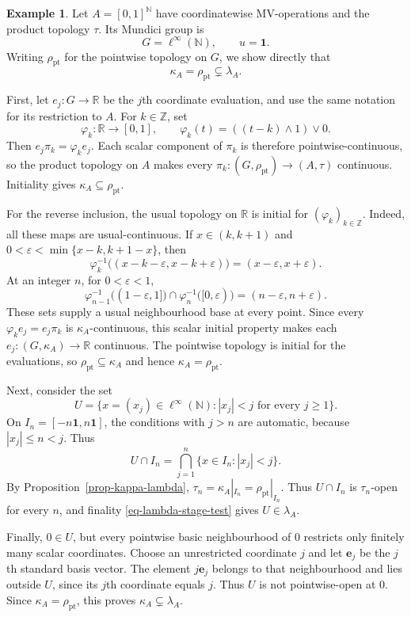 \documentclass[preprint,3p]{elsarticle}
\theoremstyle{plain}
\theoremstyle{definition}
\newtheorem{exmp}[thm]{Example}
\numberwithin{equation}{section}
\begin{document}
\begin{exmp}
\label{exmp-kappa-lambda-strict}
Let $A=[0,1]^{\mathbb N}$ have coordinatewise MV-operations and the
product topology $\tau$.  Its Mundici group is
\[
 G=\ell^\infty(\mathbb N),\qquad u=\mathbf1.
\]
Writing $\rho_{\mathrm{pt}}$ for the pointwise topology on $G$, we
show directly that
\[
 \kappa_A=\rho_{\mathrm{pt}}\subsetneq\lambda_A.
\]

First, let $e_j\colon G\longrightarrow\mathbb R$ be the $j$th
coordinate evaluation, and use the same notation for its restriction
to $A$.  For $k\in\mathbb Z$, set
\[
 \varphi_k\colon\mathbb R\longrightarrow[0,1],\qquad
 \varphi_k(t)=((t-k)\wedge1)\vee0.
\]
Then $e_j\pi_k=\varphi_ke_j$.  Each scalar component of $\pi_k$ is
therefore pointwise-continuous, so the product topology on $A$ makes
every $\pi_k\colon(G,\rho_{\mathrm{pt}})\longrightarrow(A,\tau)$
continuous.  Initiality gives $\kappa_A\subseteq\rho_{\mathrm{pt}}$.

For the reverse inclusion, the usual topology on $\mathbb R$ is
initial for $(\varphi_k)_{k\in\mathbb Z}$.  Indeed, all these maps
are usual-continuous.  If $x\in(k,k+1)$ and
$0<\varepsilon<\min\{x-k,k+1-x\}$, then
\[
 \varphi_k^{-1}\bigl((x-k-\varepsilon,x-k+\varepsilon)\bigr)
 =(x-\varepsilon,x+\varepsilon).
\]
At an integer $n$, for $0<\varepsilon<1$,
\[
 \varphi_{n-1}^{-1}\bigl((1-\varepsilon,1]\bigr)
 \cap\varphi_n^{-1}\bigl([0,\varepsilon)\bigr)
 =(n-\varepsilon,n+\varepsilon).
\]
These sets supply a usual neighbourhood base at every point.
Since every $\varphi_ke_j=e_j\pi_k$ is $\kappa_A$-continuous,
this scalar initial property makes each
$e_j\colon(G,\kappa_A)\longrightarrow\mathbb R$ continuous.
The pointwise topology is initial for the evaluations, so
$\rho_{\mathrm{pt}}\subseteq\kappa_A$ and hence
$\kappa_A=\rho_{\mathrm{pt}}$.

Next, consider the set
\[
 U=\{x=(x_j)\in\ell^\infty(\mathbb N):
                   |x_j|<j\text{ for every }j\geq1\}.
\]
On $I_n=[-n\mathbf1,n\mathbf1]$, the conditions with $j>n$ are
automatic, because $|x_j|\leq n<j$.  Thus
\[
 U\cap I_n=\bigcap_{j=1}^n\{x\in I_n:|x_j|<j\}.
\]
By Proposition~\ref{prop-kappa-lambda},
$\tau_n=\kappa_A|_{I_n}=\rho_{\mathrm{pt}}|_{I_n}$.
Thus $U\cap I_n$ is $\tau_n$-open for every $n$, and finality
\eqref{eq-lambda-stage-test} gives $U\in\lambda_A$.

Finally, $0\in U$, but every pointwise basic neighbourhood of $0$
restricts only finitely many scalar coordinates.  Choose an
unrestricted coordinate $j$ and let $\mathbf e_j$ be the $j$th
standard basis vector.  The element $j\mathbf e_j$ belongs
to that neighbourhood and lies outside $U$, since its $j$th
coordinate equals $j$.  Thus $U$ is not pointwise-open at $0$.
Since $\kappa_A=\rho_{\mathrm{pt}}$, this proves
$\kappa_A\subsetneq\lambda_A$.
\end{exmp}
\end{document}
